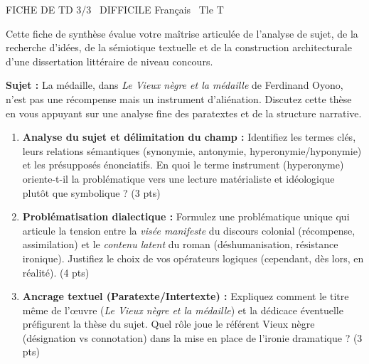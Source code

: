 \documentclass[11pt]{article}
\begin{document}
\begin{tcolorbox}[enhanced,colback=popink,colframe=popink,arc=10pt,boxrule=0pt,left=12pt,right=12pt,top=9pt,bottom=9pt]
{\color{white}\popxbold\small FICHE DE TD 3/3 \textbullet\ DIFFICILE \hfill Français \textbullet\ Tle T\par}
\end{tcolorbox}
\vspace{4pt}
\noindent Cette fiche de synthèse évalue votre maîtrise articulée de l'analyse de sujet, de la recherche d'idées, de la sémiotique textuelle et de la construction architecturale d'une dissertation littéraire de niveau concours.

\begin{exercice}
\textbf{Sujet :} \og La médaille, dans \textit{Le Vieux nègre et la médaille} de Ferdinand Oyono, n'est pas une récompense mais un instrument d'aliénation. \fg Discutez cette thèse en vous appuyant sur une analyse fine des paratextes et de la structure narrative.

\begin{enumerate}
    \item \textbf{Analyse du sujet et délimitation du champ :} Identifiez les termes clés, leurs relations sémantiques (synonymie, antonymie, hyperonymie/hyponymie) et les présupposés énonciatifs. En quoi le terme \og instrument \fg (hyperonyme) oriente-t-il la problématique vers une lecture matérialiste et idéologique plutôt que symbolique ? (3 pts)
    \item \textbf{Problématisation dialectique :} Formulez une problématique unique qui articule la tension entre la \textit{visée manifeste} du discours colonial (récompense, assimilation) et le \textit{contenu latent} du roman (déshumanisation, résistance ironique). Justifiez le choix de vos opérateurs logiques (cependant, dès lors, en réalité). (4 pts)
    \item \textbf{Ancrage textuel (Paratexte/Intertexte) :} Expliquez comment le titre même de l'œuvre (\textit{Le Vieux nègre et la médaille}) et la dédicace éventuelle préfigurent la thèse du sujet. Quel rôle joue le référent \og Vieux nègre \fg (désignation vs connotation) dans la mise en place de l'ironie dramatique ? (3 pts)
\end{enumerate}
\end{exercice}
\end{document}
